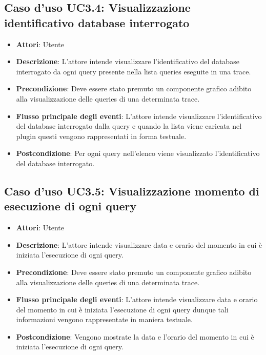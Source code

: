 \subsection{Caso d'uso UC3.4: Visualizzazione identificativo database interrogato}
\begin{itemize}
\item \textbf{Attori}: Utente
\item \textbf{Descrizione}: L'attore intende visualizzare l'identificativo del database interrogato da ogni query presente nella lista queries eseguite in una trace.
\item \textbf{Precondizione}: Deve essere stato premuto un componente grafico adibito alla visualizzazione delle queries di una determinata trace.
\item \textbf{Flusso principale degli eventi}: L'attore intende visualizzare l'identificativo del database interrogato dalla query e quando la lista viene caricata nel plugin questi vengono rappresentati in forma testuale.
\item \textbf{Postcondizione}: Per ogni query nell'elenco viene visualizzato l'identificativo del database interrogato.
\end{itemize}
\subsection{Caso d'uso UC3.5: Visualizzazione momento di esecuzione di ogni query}
\begin{itemize}
\item \textbf{Attori}: Utente
\item \textbf{Descrizione}: L'attore intende visualizzare data e orario del momento in cui è iniziata l'esecuzione di ogni query.
\item \textbf{Precondizione}: Deve essere stato premuto un componente grafico adibito alla visualizzazione delle queries di una determinata trace.
\item \textbf{Flusso principale degli eventi}: L'attore intende visualizzare data e orario del momento in cui è iniziata l'esecuzione di ogni query dunque tali informazioni vengono rappresentate in maniera testuale.
\item \textbf{Postcondizione}: Vengono mostrate la data e l'orario del momento in cui è iniziata l'esecuzione di ogni query.
\end{itemize}
